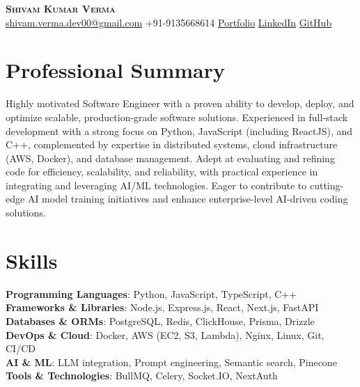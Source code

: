 \documentclass[letterpaper,10pt]{article}
\begin{document}
\begin{center}
  \textbf{\Huge \scshape Shivam Kumar Verma} \\ \vspace{4pt}
  \small \href{mailto:shivam.verma.dev00@gmail.com}{shivam.verma.dev00@gmail.com} \textbullet{} +91-9135668614 \textbullet{} \href{Portfolio}{Portfolio} \textbullet{} \href{LinkedIn}{LinkedIn} \textbullet{} \href{GitHub}{GitHub}
\end{center}

\section{Professional Summary}
\vspace{3pt}
\small{Highly motivated Software Engineer with a proven ability to develop, deploy, and optimize scalable, production-grade software solutions. Experienced in full-stack development with a strong focus on Python, JavaScript (including ReactJS), and C++, complemented by expertise in distributed systems, cloud infrastructure (AWS, Docker), and database management. Adept at evaluating and refining code for efficiency, scalability, and reliability, with practical experience in integrating and leveraging AI/ML technologies. Eager to contribute to cutting-edge AI model training initiatives and enhance enterprise-level AI-driven coding solutions.}

\section{Skills}
\begin{itemize}[leftmargin=0.15in, label={}]
  \small{\item{
    \textbf{Programming Languages}{: Python, JavaScript, TypeScript, C++} \\ \vspace{2pt}
    \textbf{Frameworks \& Libraries}{: Node.js, Express.js, React, Next.js, FastAPI} \\ \vspace{2pt}
    \textbf{Databases \& ORMs}{: PostgreSQL, Redis, ClickHouse, Prisma, Drizzle} \\ \vspace{2pt}
    \textbf{DevOps \& Cloud}{: Docker, AWS (EC2, S3, Lambda), Nginx, Linux, Git, CI/CD} \\ \vspace{2pt}
    \textbf{AI \& ML}{: LLM integration, Prompt engineering, Semantic search, Pinecone} \\ \vspace{2pt}
    \textbf{Tools \& Technologies}{: BullMQ, Celery, Socket.IO, NextAuth}
  }}
\end{itemize}
\end{document}
